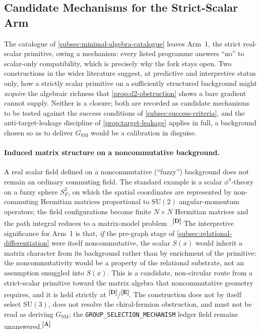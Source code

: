 \documentclass[12pt,a4paper,twoside]{article}
\theoremstyle{plain}
\theoremstyle{definition}
\theoremstyle{remark}
\newcommand{\catmark}[1]{\textsuperscript{\textsf{\textbf{[#1]}}}}
\newcommand{\Sx}{S(x)}
\begin{document}
\subsection{Candidate Mechanisms for the Strict-Scalar Arm}
\label{subsec:arm1-mechanisms}

The catalogue of \cref{subsec:minimal-algebra-catalogue} leaves Arm~1, the strict real-scalar primitive, owing a mechanism: every listed programme answers ``no'' to scalar-only compatibility, which is precisely why the fork stays open. Two constructions in the wider literature suggest, at predictive and interpretive status only, how a strictly scalar primitive on a sufficiently structured background might \emph{acquire} the algebraic richness that \cref{prop:d2-obstruction} shows a bare gradient cannot supply. Neither is a closure; both are recorded as candidate mechanisms to be tested against the success conditions of \cref{subsec:success-criteria}, and the anti-target-leakage discipline of \cref{prop:target-leakage} applies in full, a background chosen so as to deliver $G_{\mathrm{SM}}$ would be a calibration in disguise.

\paragraph{Induced matrix structure on a noncommutative background.}
A real scalar field defined on a noncommutative (``fuzzy'') background does not remain an ordinary commuting field. The standard example is a scalar $\phi^4$-theory on a fuzzy sphere $S_F^2$, on which the spatial coordinates are represented by non-commuting Hermitian matrices proportional to $\mathrm{SU}(2)$ angular-momentum operators; the field configurations become finite $N\times N$ Hermitian matrices and the path integral reduces to a matrix-model problem~\cite{fuzzy1012}.\catmark{D} The interpretive significance for Arm~1 is that, \emph{if} the pre-graph stage of \cref{subsec:relational-differentiation} were itself noncommutative, the scalar $\Sx$ would inherit a matrix character from its background rather than by enrichment of the primitive: the noncommutativity would be a property of the relational substrate, not an assumption smuggled into $\Sx$. This is a candidate, non-circular route from a strict-scalar primitive toward the matrix algebra that noncommutative geometry requires, and it is held strictly at \catmark{D}/\catmark{E}. The construction does not by itself select $\mathrm{SU}(3)$, does not resolve the chiral-fermion obstruction, and must not be read as deriving $G_{\mathrm{SM}}$; the \texttt{GROUP\_SELECTION\_MECHANISM} ledger field remains unanswered.\catmark{A}
\end{document}
